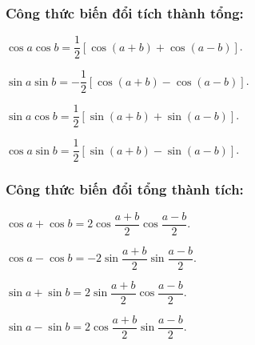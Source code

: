 \subsubsection{Công thức biến đổi tích thành tổng:}
\begin{gachsoc}
	\begin{listEX}[1]
		\item [\ding{172}] $\cos a\cos b=\dfrac{1}{2}\left[{\cos \left({a+b}\right)+\cos \left({a-b}\right)}\right]$.
		\item [\ding{173}] $\sin a\sin b=-\dfrac{1}{2}\left[{\cos\left({a+b}\right)-\cos\left({a-b}\right)}\right]$.
		\item [\ding{174}] $\sin a\cos b=\dfrac{1}{2}\left[{\sin\left({a+b}\right)+\sin\left({a-b}\right)}\right]$.
		\item [\ding{175}] $\cos a\sin b=\dfrac{1}{2}\left[{\sin\left({a+b}\right)-\sin\left({a-b}\right)}\right]$.
	\end{listEX}
\end{gachsoc}

\subsubsection{Công thức biến đổi tổng thành tích:}
\begin{gachsoc}
	\begin{listEX}[2]
		\item [\ding{172}] $\cos a+\cos b=2\cos \dfrac{{a+b}}{2}\cos \dfrac{{a-b}}{2}$.
		\item [\ding{173}] $\cos a-\cos b=-2\sin\dfrac{{a+b}}{2}\sin\dfrac{{a-b}}{2}$.
		\item [\ding{174}] $\sin a+\sin b=2\sin \dfrac{{a+b}}{2}\cos \dfrac{{a-b}}{2}$.
		\item [\ding{175}] $\sin a-\sin b=2\cos\dfrac{{a+b}}{2}\sin\dfrac{{a-b}}{2}$.
	\end{listEX}
\end{gachsoc}
